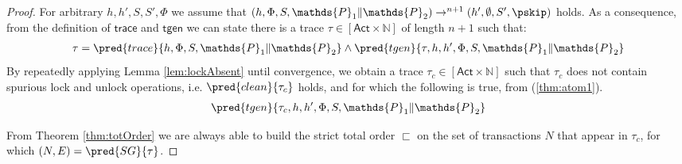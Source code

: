 {\begin{proof}
\newpage 
For arbitrary $h, h', S, S', \Phi$ we assume that $(h, \Phi, S, \mathds{P}_1 \| \mathds{P}_2) \rightarrow^{n+1} (h', \emptyset, S', \pskip)$ holds. As a consequence, from the definition of $\mathsf{trace}$ and $\mathsf{tgen}$ we can state there is a trace $\tau \in [\mathsf{Act} \times \mathds{N}]$ of length $n + 1$ such that:
\begin{gather}
	\label{thm:atom1}
	\tau = \pred{trace}{h, \Phi, S, \mathds{P}_1 \| \mathds{P}_2} \land \pred{tgen}{\tau, h, h', \Phi, S, \mathds{P}_1 \| \mathds{P}_2}
\end{gather}
By repeatedly applying Lemma \ref{lem:lockAbsent} until convergence, we obtain a trace $\tau_c \in [\mathsf{Act} \times \mathds{N}]$ such that $\tau_c$ does not contain spurious lock and unlock operations, i.e. $\pred{clean}{\tau_c}$ holds, and for which the following is true, from (\ref{thm:atom1}).
\begin{gather}
	\label{thm:atom2} \pred{tgen}{\tau_c, h, h', \Phi, S, \mathds{P}_1 \| \mathds{P}_2}
\end{gather}

From Theorem \ref{thm:totOrder} we are always able to build the strict total order $\sqsubset$ on the set of transactions $N$ that appear in $\tau_c$, for which $(N, E) = \pred{SG}{\tau}$.


\end{proof}}
